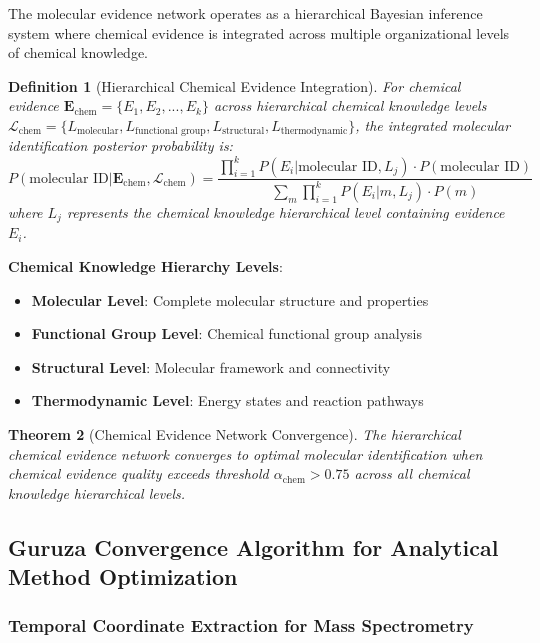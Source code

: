 \documentclass[11pt,a4paper]{article}
\newtheorem{theorem}{Theorem}[section]
\newtheorem{definition}[theorem]{Definition}
\theoremstyle{remark}
\begin{document}
The molecular evidence network operates as a hierarchical Bayesian inference system where chemical evidence is integrated across multiple organizational levels of chemical knowledge.

\begin{definition}[Hierarchical Chemical Evidence Integration]
For chemical evidence $\mathbf{E}_{\text{chem}} = \{E_1, E_2, ..., E_k\}$ across hierarchical chemical knowledge levels $\mathcal{L}_{\text{chem}} = \{L_{\text{molecular}}, L_{\text{functional group}}, L_{\text{structural}}, L_{\text{thermodynamic}}\}$, the integrated molecular identification posterior probability is:
\begin{equation}
P(\text{molecular ID} | \mathbf{E}_{\text{chem}}, \mathcal{L}_{\text{chem}}) = \frac{\prod_{i=1}^{k} P(E_i | \text{molecular ID}, L_j) \cdot P(\text{molecular ID})}{\sum_{m} \prod_{i=1}^{k} P(E_i | m, L_j) \cdot P(m)}
\end{equation}
where $L_j$ represents the chemical knowledge hierarchical level containing evidence $E_i$.
\end{definition}

\textbf{Chemical Knowledge Hierarchy Levels}:
\begin{itemize}
\item \textbf{Molecular Level}: Complete molecular structure and properties
\item \textbf{Functional Group Level}: Chemical functional group analysis
\item \textbf{Structural Level}: Molecular framework and connectivity
\item \textbf{Thermodynamic Level}: Energy states and reaction pathways
\end{itemize}

\begin{theorem}[Chemical Evidence Network Convergence]
The hierarchical chemical evidence network converges to optimal molecular identification when chemical evidence quality exceeds threshold $\alpha_{\text{chem}} > 0.75$ across all chemical knowledge hierarchical levels.
\end{theorem}

\subsection{Guruza Convergence Algorithm for Analytical Method Optimization}

\subsubsection{Temporal Coordinate Extraction for Mass Spectrometry}
\end{document}
